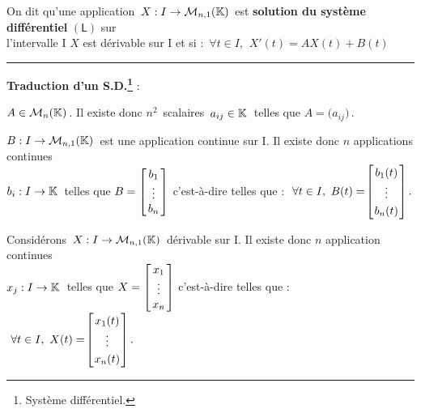 \vspace{1cm}

On dit qu'une application \(\,X:I\to \mathcal{M}_{n,1}(\mathbb{K})\,\) est \textbf{solution du système différentiel} \((\mathsf{L})\) sur\vspace{0.1cm}\\
l'intervalle I \ssi $X$ est dérivable sur I et si : \(\, \forall t\in I,\ \, X'(t)=AX(t)+B(t)\)

\vspace{1cm}

\hrule

\vspace{1cm}

\begin{center}
\textbf{Traduction d'un S.D.\footnote{Système différentiel.}} :\end{center} 
\vspace{0.7cm}

\noindent \(A\in \mathcal{M}_n(\mathbb{K})\,\). Il existe donc $n^2\,$ scalaires \(\,a_{ij}\in \mathbb{K} \: \) telles que \(A=\bigl(a_{ij}\bigr)\,\).\vspace{0.5cm}

\(B:I\to \mathcal{M}_{n,1}(\mathbb{K})\,\) est une application continue sur I. Il existe donc $n$ applications continues\\
\(b_i:I\to \mathbb{K} \: \) telles que \(B=\arraycolsep=0.05cm\def\arraystretch{1} \left[
\begin{array}{c}
    b_1\\
    \vdots\\
    b_n
\end{array}    
\right]\) c'est-à-dire telles que : \(\ \forall t \in I,\ B(t)=\!\arraycolsep=0.03cm\def\arraystretch{1.2}\left[
    \begin{array}{c}
        b_1(t)\\
        \vdots\\
        b_n(t)
    \end{array}    
    \right].\)

\vspace{0.5cm}

Considérons \(\,X:I\to\mathcal{M}_{n,1}(\mathbb{K})\,\) dérivable sur I. Il existe donc $n$ application continues\\
\(x_j:I\to \mathbb{K} \: \) telles que \(X=\arraycolsep=0.05cm\def\arraystretch{1} \left[
\begin{array}{c}
    x_1\\
    \vdots\\
    x_n
\end{array}    
\right]\) c'est-à-dire telles que : \(\ \forall t \in I,\ X(t)=\!\arraycolsep=0.03cm\def\arraystretch{1.2}\left[
    \begin{array}{c}
        x_1(t)\\
        \vdots\\
        x_n(t)
    \end{array}    
    \right].\)

